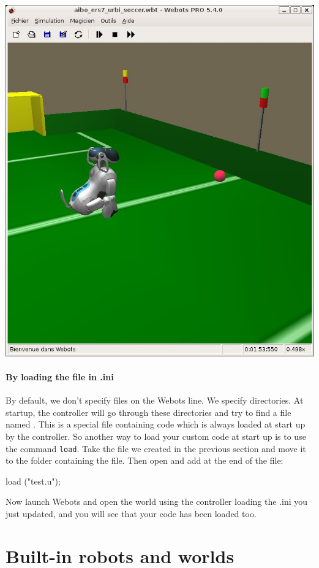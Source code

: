 \begin{center}
  \includegraphics[width=.8\linewidth]{img/webots/aibo-sat}
\end{center}



\paragraph{By loading the file in \urbi.ini}

By default, we don't specify files on the Webots 
line. We specify directories.  At startup, the \urbi controller will
go through these directories and try to find a file named
. This is a special file containing \us code
which is always loaded at start up by the \urbi controller. So another
way to load your custom \urbi code at start up is to use the command
\lstinline|load|.  Take the  file we created in the previous
section and move it to the folder containing the 
file. Then open  and add at the end of the file:

\begin{urbifixme}
load ("test.u");
\end{urbifixme}
Now launch Webots and open the world using the \urbi controller loading
the \urbi.ini you just updated, and you will see that your code has
been loaded too.


\section{Built-{}in robots and worlds}

